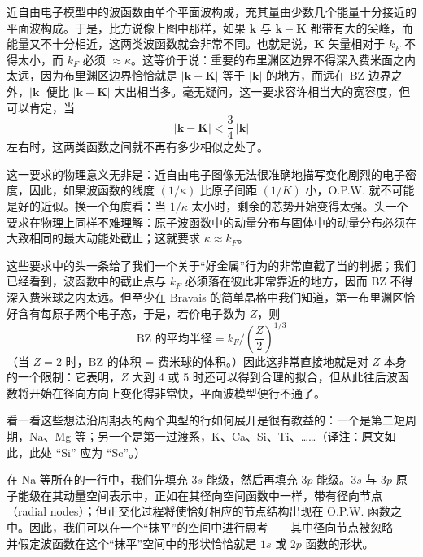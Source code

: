 
近自由电子模型中的波函数由单个平面波构成，充其量由少数几个能量十分接近的平面波构成。于是，比方说像上图中那样，如果 $\mathbf{k}$ 与 $\mathbf{k} - \mathbf{K}$ 都带有大的尖峰，而能量又不十分相近，这两类波函数就会非常不同。也就是说，$\mathbf{K}$ 矢量相对于 $k_F$ 不得太小，而 $k_F$ 必须 $\approx \kappa$。这等价于说：重要的布里渊区边界不得深入费米面之内太远，因为布里渊区边界恰恰就是 $|\mathbf{k} - \mathbf{K}|$ 等于 $|\mathbf{k}|$ 的地方，而远在 BZ 边界之外，$|\mathbf{k}|$ 便比 $|\mathbf{k} - \mathbf{K}|$ 大出相当多。毫无疑问，这一要求容许相当大的宽容度，但可以肯定，当
\begin{equation*}
|\mathbf{k} - \mathbf{K}| < \frac{3}{4}\,|\mathbf{k}|
\end{equation*}
左右时，这两类函数之间就不再有多少相似之处了。

这一要求的物理意义无非是：近自由电子图像无法很准确地描写变化剧烈的电子密度，因此，如果波函数的线度 $(1/\kappa)$ 比原子间距 $(1/K)$ 小，O.P.W. 就不可能是好的近似。换一个角度看：当 $1/\kappa$ 太小时，剩余的芯势开始变得太强。头一个要求在物理上同样不难理解：原子波函数中的动量分布与固体中的动量分布必须在大致相同的最大动能处截止；这就要求 $\kappa \approx k_F$。

这些要求中的头一条给了我们一个关于“好金属”行为的非常直截了当的判据；我们已经看到，波函数中的截止点与 $k_F$ 必须落在彼此非常靠近的地方，因而 BZ 不得深入费米球之内太远。但至少在 Bravais 的简单晶格中我们知道，第一布里渊区恰好含有每原子两个电子态，于是，若价电子数为 $Z$，则
\begin{equation*}
\text{BZ 的平均半径} = k_F \Big/ \left(\frac{Z}{2}\right)^{1/3}
\end{equation*}
（当 $Z = 2$ 时，BZ 的体积 = 费米球的体积。）因此这非常直接地就是对 $Z$ 本身的一个限制：它表明，$Z$ 大到 4 或 5 时还可以得到合理的拟合，但从此往后波函数将开始在径向方向上变化得非常快，平面波模型便行不通了。

看一看这些想法沿周期表的两个典型的行如何展开是很有教益的：一个是第二短周期，Na、Mg 等；另一个是第一过渡系，K、Ca、Si、Ti、……（译注：原文如此，此处 “Si” 应为 “Sc”。）

在 Na 等所在的一行中，我们先填充 $3s$ 能级，然后再填充 $3p$ 能级。$3s$ 与 $3p$ 原子能级在其动量空间表示中，正如在其径向空间函数中一样，带有径向节点（radial nodes）；但正交化过程将使恰好相应的节点结构出现在 O.P.W. 函数之中。因此，我们可以在一个“抹平”的空间中进行思考——其中径向节点被忽略——并假定波函数在这个“抹平”空间中的形状恰恰就是 $1s$ 或 $2p$ 函数的形状。

